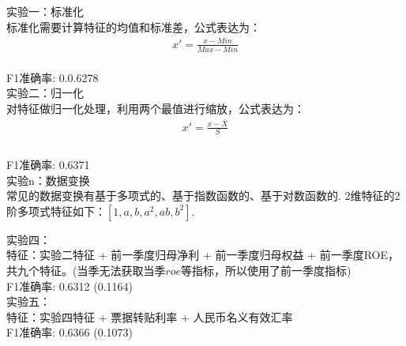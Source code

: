 \documentclass[10pt,a4paper]{article}
\begin{document}
\noindent 实验一：标准化\\
标准化需要计算特征的均值和标准差，公式表达为：
\begin{equation}
\label{eq:u0}
\begin{aligned}
{x}'= \frac{x-Min}{Max-Min}
\end{aligned}
\end{equation}\\
F1准确率: 0.0.6278 \\

\noindent 实验二：归一化\\
对特征做归一化处理，利用两个最值进行缩放，公式表达为：
\begin{equation}
\label{eq:u0}
\begin{aligned}
{x}'= \frac{x-\bar{X}}{S}\\
\end{aligned}
\end{equation}\\
F1准确率: 0.6371\\
		
		
\noindent  实验n：数据变换\\

常见的数据变换有基于多项式的、基于指数函数的、基于对数函数的. 2维特征的2阶多项式特征如下：$[1, a, b, a^2, ab, b^2].$
		
\noindent  实验四：\\
特征：实验二特征 + 前一季度归母净利 + 前一季度归母权益 + 前一季度ROE，共九个特征。(当季无法获取当季$roe$等指标，所以使用了前一季度指标)\\
F1准确率: 0.6312 (0.1164)\\

\noindent  实验五：\\
特征：实验四特征 + 票据转贴利率 + 人民币名义有效汇率\\
F1准确率: 0.6366 (0.1073)\\

%	
	
\end{document}
